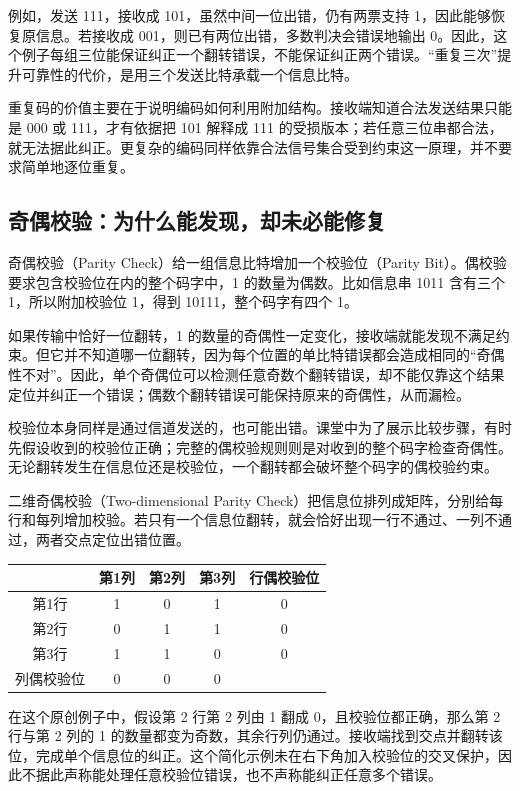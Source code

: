 例如，发送 111，接收成 101，虽然中间一位出错，仍有两票支持 1，因此能够恢复原信息。若接收成 001，则已有两位出错，多数判决会错误地输出 0。因此，这个例子每组三位能保证纠正一个翻转错误，不能保证纠正两个错误。“重复三次”提升可靠性的代价，是用三个发送比特承载一个信息比特。

重复码的价值主要在于说明编码如何利用附加结构。接收端知道合法发送结果只能是 000 或 111，才有依据把 101 解释成 111 的受损版本；若任意三位串都合法，就无法据此纠正。更复杂的编码同样依靠合法信号集合受到约束这一原理，并不要求简单地逐位重复。

\subsection{奇偶校验：为什么能发现，却未必能修复}
奇偶校验（Parity Check）给一组信息比特增加一个校验位（Parity Bit）。偶校验要求包含校验位在内的整个码字中，1 的数量为偶数。比如信息串 1011 含有三个 1，所以附加校验位 1，得到 10111，整个码字有四个 1。

如果传输中恰好一位翻转，1 的数量的奇偶性一定变化，接收端就能发现不满足约束。但它并不知道哪一位翻转，因为每个位置的单比特错误都会造成相同的“奇偶性不对”。因此，单个奇偶位可以检测任意奇数个翻转错误，却不能仅靠这个结果定位并纠正一个错误；偶数个翻转错误可能保持原来的奇偶性，从而漏检。

校验位本身同样是通过信道发送的，也可能出错。课堂中为了展示比较步骤，有时先假设收到的校验位正确；完整的偶校验规则则是对收到的整个码字检查奇偶性。无论翻转发生在信息位还是校验位，一个翻转都会破坏整个码字的偶校验约束。

二维奇偶校验（Two-dimensional Parity Check）把信息位排列成矩阵，分别给每行和每列增加校验。若只有一个信息位翻转，就会恰好出现一行不通过、一列不通过，两者交点定位出错位置。

\begin{center}
\begin{tabular}{c|ccc|c}
 & 第1列 & 第2列 & 第3列 & 行偶校验位\\\hline
第1行 & 1 & 0 & 1 & 0\\
第2行 & 0 & 1 & 1 & 0\\
第3行 & 1 & 1 & 0 & 0\\\hline
列偶校验位 & 0 & 0 & 0 & \\
\end{tabular}
\end{center}
在这个原创例子中，假设第 2 行第 2 列由 1 翻成 0，且校验位都正确，那么第 2 行与第 2 列的 1 的数量都变为奇数，其余行列仍通过。接收端找到交点并翻转该位，完成单个信息位的纠正。这个简化示例未在右下角加入校验位的交叉保护，因此不据此声称能处理任意校验位错误，也不声称能纠正任意多个错误。

